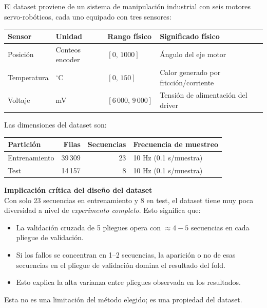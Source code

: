 \documentclass[12pt,a4paper]{article}
\begin{document}
El dataset proviene de un sistema de manipulaci\'{o}n industrial con seis motores
servo-rob\'{o}ticos, cada uno equipado con tres sensores:

\begin{center}
\begin{tabular}{llll}
\toprule
\textbf{Sensor} & \textbf{Unidad} & \textbf{Rango f\'{i}sico} & \textbf{Significado f\'{i}sico} \\
\midrule
Posici\'{o}n & Conteos encoder & $[0,\, 1000]$ & \'{A}ngulo del eje motor \\
Temperatura & $^\circ$C & $[0,\, 150]$ & Calor generado por fricci\'{o}n/corriente \\
Voltaje & mV & $[6\,000,\, 9\,000]$ & Tensi\'{o}n de alimentaci\'{o}n del driver \\
\bottomrule
\end{tabular}
\end{center}

Las dimensiones del dataset son:

\begin{center}
\begin{tabular}{lrrl}
\toprule
\textbf{Partici\'{o}n} & \textbf{Filas} & \textbf{Secuencias} & \textbf{Frecuencia de muestreo} \\
\midrule
Entrenamiento & 39\,309 & 23 & 10 Hz (0.1 s/muestra) \\
Test          & 14\,157 & 8  & 10 Hz (0.1 s/muestra) \\
\bottomrule
\end{tabular}
\end{center}

\begin{advertenciabox}
\textbf{Implicaci\'{o}n cr\'{i}tica del dise\~{n}o del dataset}\\[4pt]
Con solo 23 secuencias en entrenamiento y 8 en test, el dataset tiene muy poca
diversidad a nivel de \textit{experimento completo}. Esto significa que:
\begin{itemize}[itemsep=2pt]
  \item La validaci\'{o}n cruzada de 5 pliegues opera con $\approx 4{-}5$ secuencias
    en cada pliegue de validaci\'{o}n.
  \item Si los fallos se concentran en 1--2 secuencias, la aparici\'{o}n o no de esas
    secuencias en el pliegue de validaci\'{o}n domina el resultado del fold.
  \item Esto explica la alta varianza entre pliegues observada en los resultados.
\end{itemize}
Esta no es una limitaci\'{o}n del m\'{e}todo elegido; es una propiedad del dataset.
\end{advertenciabox}
\end{document}
